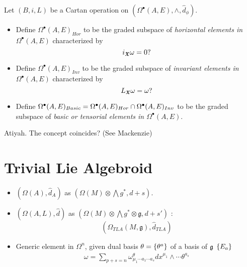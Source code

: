 \begin{definition}
Let $(B, i, L)$ be a Cartan operation on $(\Omega^\bullet(A, E), \wedge, \hat d_\phi)$.
    
    \begin{itemize}
        
    \item Define $\Omega^\bullet(A, E)_{Hor}$ to be the graded subspace of \emph{horizontal elements in $\Omega^\bullet(A, E)$} characterized by 
    \[
    i_{\bm{\mathfrak{X}}} \omega = 0?
    \]
    
    \item Define $\Omega^\bullet(A, E)_{Inv}$ to be the graded subspace of \emph{invariant elements in $\Omega^\bullet(A, E)$} characterized by 
    \[
    L_{\bm{\mathfrak{X}}} \omega = \omega?
    \]
    
    \item Define $\Omega^\bullet(A, E)_{Basic} = \Omega^\bullet(A, E)_{Hor} \cap \Omega^\bullet(A, E)_{Inv}$ to be the graded subspace of \emph{basic or tensorial elements in $\Omega^\bullet(A, E)$}.
        
    \end{itemize}
    
\end{definition}

\begin{example}
Atiyah. The concept coincides? (See Mackenzie)
\end{example}
\section{Trivial Lie Algebroid}

\begin{itemize}
    
\item $(\Omega(A), \hat d_A)$ as $(\Omega(M)\otimes \bigwedge g^*, d + s)$.

\item $(\Omega(A, L), \hat d)$ as $(\Omega(M)\otimes \bigwedge g^* \otimes \mathfrak g, d + s')$ : \[(\Omega_{TLA}(M, \mathfrak g), \hat d_{TLA})\]

\item Generic element in $\Omega^n$, given dual basis $\theta = \left\{ \theta^a \right\}$ of a basis of $\mathfrak{g}$ $\left\{ E_a \right\}$
\begin{align*}
    \omega = \sum_{p + s = n} \omega^\theta_{\mu_1 \cdots a_1 \cdots a_s} dx^{\mu_1} \wedge \cdots \theta^{a_s}
\end{align*}
    
\end{itemize}

